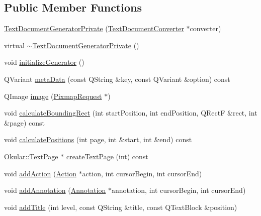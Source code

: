\subsection*{Public Member Functions}
\begin{DoxyCompactItemize}
\item 
\hyperlink{classOkular_1_1TextDocumentGeneratorPrivate_ace3f2856c2229ab517e7b53cfd4e9eaa}{Text\+Document\+Generator\+Private} (\hyperlink{classOkular_1_1TextDocumentConverter}{Text\+Document\+Converter} $\ast$converter)
\item 
virtual \hyperlink{classOkular_1_1TextDocumentGeneratorPrivate_ae1e9a45e22ea293af7ac886c1ab6a484}{$\sim$\+Text\+Document\+Generator\+Private} ()
\item 
void \hyperlink{classOkular_1_1TextDocumentGeneratorPrivate_a51ac369d9713dbd21784502560b4c24f}{initialize\+Generator} ()
\item 
Q\+Variant \hyperlink{classOkular_1_1TextDocumentGeneratorPrivate_ad2fa8ddf09fc98bc99c976e5b7db1bf6}{meta\+Data} (const Q\+String \&key, const Q\+Variant \&option) const 
\item 
Q\+Image \hyperlink{classOkular_1_1TextDocumentGeneratorPrivate_a6245b449cf861a0841a38377205fbd8c}{image} (\hyperlink{classOkular_1_1PixmapRequest}{Pixmap\+Request} $\ast$)
\item 
void \hyperlink{classOkular_1_1TextDocumentGeneratorPrivate_a5f21990c6dd5f78ea2842739f7b704c0}{calculate\+Bounding\+Rect} (int start\+Position, int end\+Position, Q\+Rect\+F \&rect, int \&page) const 
\item 
void \hyperlink{classOkular_1_1TextDocumentGeneratorPrivate_aea72762d1f1702c11e6408b098399cb9}{calculate\+Positions} (int page, int \&start, int \&end) const 
\item 
\hyperlink{classOkular_1_1TextPage}{Okular\+::\+Text\+Page} $\ast$ \hyperlink{classOkular_1_1TextDocumentGeneratorPrivate_a2f8b40b158be42ffd399447afaf596f2}{create\+Text\+Page} (int) const 
\item 
void \hyperlink{classOkular_1_1TextDocumentGeneratorPrivate_a71f9541dce145e0233c5477b293a3962}{add\+Action} (\hyperlink{classOkular_1_1Action}{Action} $\ast$action, int cursor\+Begin, int cursor\+End)
\item 
void \hyperlink{classOkular_1_1TextDocumentGeneratorPrivate_ae2d64248e306cca0d3af1d30c2eb4bf9}{add\+Annotation} (\hyperlink{classOkular_1_1Annotation}{Annotation} $\ast$annotation, int cursor\+Begin, int cursor\+End)
\item 
void \hyperlink{classOkular_1_1TextDocumentGeneratorPrivate_a91d516e83aa89bbdfd183ef6435dbaee}{add\+Title} (int level, const Q\+String \&title, const Q\+Text\+Block \&position)

\end{DoxyCompactItemize}
